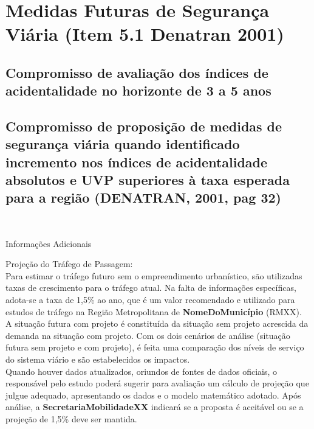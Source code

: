 \documentclass[]{article}
\begin{document}
~

\hypertarget{medidas-futuras-de-seguranuxe7a-viuxe1ria-item-5.1-denatran-2001}{%
\section{Medidas Futuras de Segurança Viária (Item 5.1 Denatran
2001)}\label{medidas-futuras-de-seguranuxe7a-viuxe1ria-item-5.1-denatran-2001}}

\hypertarget{compromisso-de-avaliauxe7uxe3o-dos-uxedndices-de-acidentalidade-no-horizonte-de-3-a-5-anos}{%
\subsection{Compromisso de avaliação dos índices de acidentalidade no
horizonte de 3 a 5
anos}\label{compromisso-de-avaliauxe7uxe3o-dos-uxedndices-de-acidentalidade-no-horizonte-de-3-a-5-anos}}

\hypertarget{compromisso-de-proposiuxe7uxe3o-de-medidas-de-seguranuxe7a-viuxe1ria-quando-identificado-incremento-nos-uxedndices-de-acidentalidade-absolutos-e-uvp-superiores-uxe0-taxa-esperada-para-a-regiuxe3o-denatran-2001-pag-32}{%
\subsection{Compromisso de proposição de medidas de segurança viária
quando identificado incremento nos índices de acidentalidade absolutos e
UVP superiores à taxa esperada para a região (DENATRAN, 2001, pag
32)}\label{compromisso-de-proposiuxe7uxe3o-de-medidas-de-seguranuxe7a-viuxe1ria-quando-identificado-incremento-nos-uxedndices-de-acidentalidade-absolutos-e-uvp-superiores-uxe0-taxa-esperada-para-a-regiuxe3o-denatran-2001-pag-32}}

~

{ Informações Adicionais }

Projeção do Tráfego de Passagem:\\
Para estimar o tráfego futuro sem o empreendimento urbanístico, são
utilizadas taxas de crescimento para o tráfego atual. Na falta de
informações específicas, adota-se a taxa de 1,5\% ao ano, que é um valor
recomendado e utilizado para estudos de tráfego na Região Metropolitana
de \textbf{NomeDoMunicípio} (RMXX).\\
A situação futura com projeto é constituída da situação sem projeto
acrescida da demanda na situação com projeto. Com os dois cenários de
análise (situação futura sem projeto e com projeto), é feita uma
comparação dos níveis de serviço do sistema viário e são estabelecidos
os impactos.\\
Quando houver dados atualizados, oriundos de fontes de dados oficiais, o
responsável pelo estudo poderá sugerir para avaliação um cálculo de
projeção que julgue adequado, apresentando os dados e o modelo
matemático adotado. Após análise, a \textbf{SecretariaMobilidadeXX}
indicará se a proposta é aceitável ou se a projeção de 1,5\% deve ser
mantida.
\end{document}
